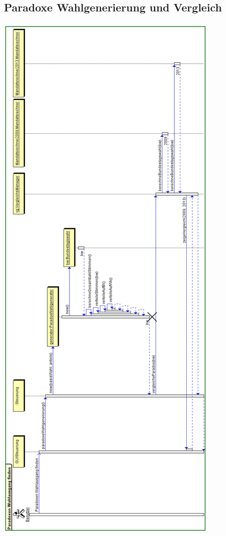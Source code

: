 \documentclass[10pt,a4paper]{article}
\begin{document}
\subsection{Paradoxe Wahlgenerierung und Vergleich}
\includegraphics[scale=0.75]{paradoxeWahlgenerierung+Vergleich-Sequenzdiagramm.png} 
\end{document}
